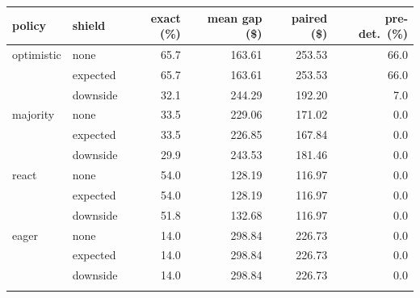 \begin{tabular}{llrrrr}
\toprule
policy & shield & exact (\%) & mean gap (\$) & paired (\$) & pre-det.\ (\%) \\
\midrule
optimistic & none & 65.7 & 163.61 & 253.53 & 66.0 \\
 & expected & 65.7 & 163.61 & 253.53 & 66.0 \\
 & downside & 32.1 & 244.29 & 192.20 & 7.0 \\
\addlinespace
majority & none & 33.5 & 229.06 & 171.02 & 0.0 \\
 & expected & 33.5 & 226.85 & 167.84 & 0.0 \\
 & downside & 29.9 & 243.53 & 181.46 & 0.0 \\
\addlinespace
react & none & 54.0 & 128.19 & 116.97 & 0.0 \\
 & expected & 54.0 & 128.19 & 116.97 & 0.0 \\
 & downside & 51.8 & 132.68 & 116.97 & 0.0 \\
\addlinespace
eager & none & 14.0 & 298.84 & 226.73 & 0.0 \\
 & expected & 14.0 & 298.84 & 226.73 & 0.0 \\
 & downside & 14.0 & 298.84 & 226.73 & 0.0 \\
\addlinespace
\bottomrule
\end{tabular}